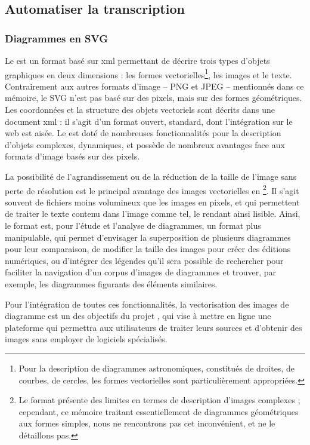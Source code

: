 
\subsection{Automatiser la transcription}
	\subsubsection{Diagrammes en SVG}
	Le \svg est un format basé sur \acrshort{xml} permettant de décrire trois types d'objets graphiques en deux dimensions : les formes vectorielles\footnote{Pour la description de diagrammes astronomiques, constitués de droites, de courbes, de cercles, les formes vectorielles sont particulièrement appropriées.}, les images et le texte. Contrairement aux autres formats d'image -- PNG et JPEG -- mentionnés dans ce mémoire, le SVG n'est pas basé sur des pixels, mais sur des formes géométriques. Les coordonnées et la structure des objets vectoriels sont décrits dans une document \acrshort{xml} : il s'agit d'un format ouvert, standard, dont l'intégration sur le web est aisée. Le \svg est doté de nombreuses fonctionnalités pour la description d'objets complexes, dynamiques, et possède de nombreux avantages face aux formats d'image basés sur des pixels.
	
	La possibilité de l'agrandissement ou de la réduction de la taille de l'image sans perte de résolution est le principal avantage des images vectorielles en \svg\footnote{Le format \svg présente des limites en termes de description d'images complexes ; cependant, ce mémoire traitant essentiellement de diagrammes géométriques aux formes simples, nous ne rencontrons pas cet inconvénient, et ne le détaillons pas.}. Il s'agit souvent de fichiers moins volumineux que les images en pixels, et qui permettent de traiter le texte contenu dans l'image comme tel, le rendant ainsi lisible. Ainsi, le format \svg est, pour l'étude et l'analyse de diagrammes, un format plus manipulable, qui permet d'envisager la superposition de plusieurs diagrammes pour leur comparaison, de modifier la taille des images pour créer des éditions numériques, ou d'intégrer des légendes qu'il sera possible de rechercher pour faciliter la navigation d'un corpus d'images de diagrammes et trouver, par exemple, les diagrammes figurants des éléments similaires.
	
	Pour l'intégration de toutes ces fonctionnalités, la vectorisation des images de diagramme est un des objectifs du projet \eida, qui vise à mettre en ligne une plateforme qui permettra aux utilisateurs de traiter leurs sources et d'obtenir des images \svg sans employer de logiciels spécialisés.
	
